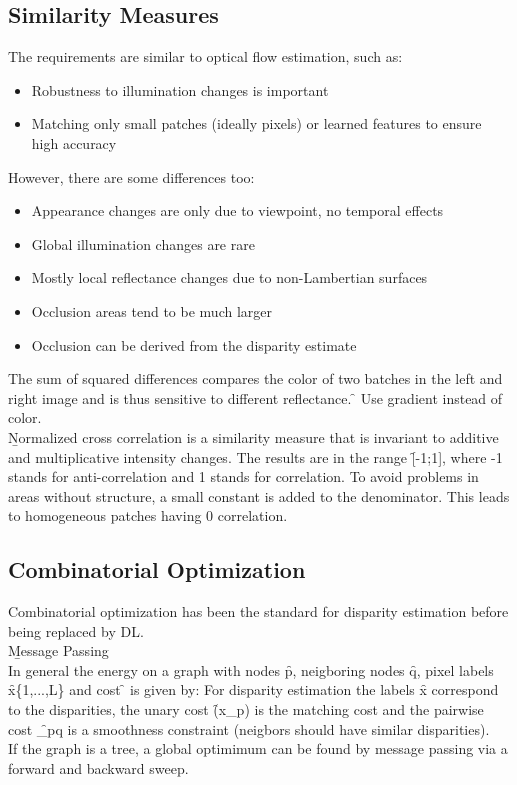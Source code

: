 \subsection{Similarity Measures}
The requirements are similar to optical flow estimation, such as:
\begin{itemize}
    \item Robustness to illumination changes is important
    \item Matching only small patches (ideally pixels) or learned features to ensure high accuracy
\end{itemize}

However, there are some differences too:
\begin{itemize}
    \item Appearance changes are only due to viewpoint, no temporal effects
    \item Global illumination changes are rare
    \item Mostly local reflectance changes due to non-Lambertian surfaces
    \item Occlusion areas tend to be much larger
    \item Occlusion can be derived from the disparity estimate
\end{itemize}

The sum of squared differences compares the color of two batches in the left and right image and is thus sensitive to different reflectance. \f{\to} Use gradient instead of color.\\

\b{Normalized cross correlation} is a similarity measure that is invariant to additive and multiplicative intensity changes. The results are in the range \f{[-1;1]}, where -1 stands for anti-correlation and 1 stands for correlation. To avoid problems in areas without structure, a small constant is added to the denominator. This leads to homogeneous patches having 0 correlation.

\subsection{Combinatorial Optimization}
Combinatorial optimization has been the standard for disparity estimation before being replaced by DL.\\

\b{Message Passing\\[.5em]}
In general the energy on a graph with nodes \f{p}, neigboring nodes \f{q}, pixel labels \f{x\in\{1,...,L\}} and cost \f{\theta} is given by:
For disparity estimation the labels \f{x} correspond to the disparities, the unary cost \f{\theta(x_p)} is the matching cost and the pairwise cost \f{\theta_{pq}} is a smoothness constraint (neigbors should have similar disparities).\\
If the graph is a tree, a global optimimum can be found by message passing via a forward and backward sweep.\\

